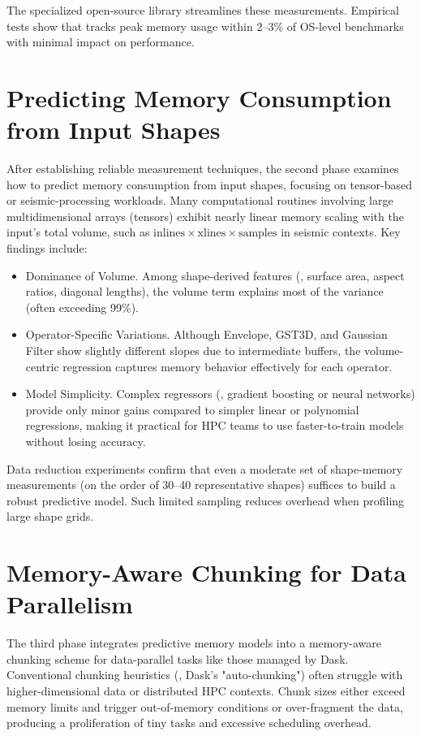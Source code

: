 The specialized open-source library \traceq streamlines these measurements.
Empirical tests show that \traceq tracks peak memory usage within 2--3\% of \ac{OS}-level benchmarks with minimal impact on performance.


\section{Predicting Memory Consumption from Input Shapes}
\label{sec:conc-predict}

After establishing reliable measurement techniques, the second phase examines how to predict memory consumption from input shapes, focusing on tensor-based or seismic-processing workloads.
Many computational routines involving large multidimensional arrays (tensors) exhibit nearly linear memory scaling with the input's total volume, such as
\(
\text{inlines} \times \text{xlines} \times \text{samples}
\)
in seismic contexts.
Key findings include:
\begin{itemize}
    \item Dominance of Volume.
    Among shape-derived features (\eg, surface area, aspect ratios, diagonal lengths), the volume term explains most of the variance (often exceeding 99\%).
    \item Operator-Specific Variations.
    Although Envelope, \ac{GST3D}, and Gaussian Filter show slightly different slopes due to intermediate buffers, the volume-centric regression captures memory behavior effectively for each operator.
    \item Model Simplicity.
    Complex regressors (\eg, gradient boosting or neural networks) provide only minor gains compared to simpler linear or polynomial regressions, making it practical for \ac{HPC} teams to use faster-to-train models without losing accuracy.
\end{itemize}

Data reduction experiments confirm that even a moderate set of shape-memory measurements (on the order of 30–40 representative shapes) suffices to build a robust predictive model.
Such limited sampling reduces overhead when profiling large shape grids.


\section{Memory-Aware Chunking for Data Parallelism}
\label{sec:conc-chunking}

The third phase integrates predictive memory models into a memory-aware chunking scheme for data-parallel tasks like those managed by Dask.
Conventional chunking heuristics (\eg, Dask's "auto-chunking") often struggle with higher-dimensional data or distributed \ac{HPC} contexts.
Chunk sizes either exceed memory limits and trigger out-of-memory conditions or over-fragment the data, producing a proliferation of tiny tasks and excessive scheduling overhead.

